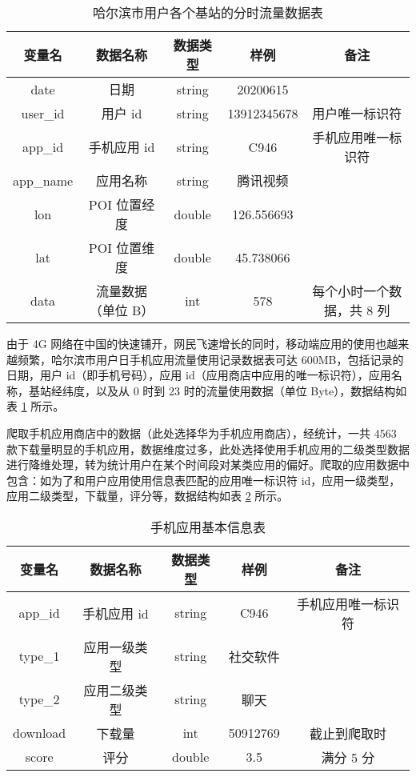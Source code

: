 \begin{table}[htbp]
    \caption{哈尔滨市用户各个基站的分时流量数据表}
    \vspace{0.5em}\centering\wuhao
    \begin{tabular}{ccccc}
        \toprule[1.5pt]
        变量名 & 数据名称 & 数据类型 & 样例 & 备注 \\
        \midrule[1pt]
        date & 日期 & string & 20200615 & \\
        user\_id & 用户 id & string & 13912345678 & 用户唯一标识符 \\
        app\_id & 手机应用 id & string & C946 & 手机应用唯一标识符 \\
        app\_name & 应用名称 & string & 腾讯视频 & \\
        lon & POI 位置经度 & double & 126.556693 & \\
        lat & POI 位置维度 & double & 45.738066 & \\
        data & 流量数据（单位 B） & int & 578 & 每个小时一个数据，共 8 列 \\
        \bottomrule[1.5pt]
    \end{tabular}
    \label{tab:app_use}
\end{table}

由于 4G 网络在中国的快速铺开，网民飞速增长的同时，移动端应用的使用也越来越频繁，哈尔滨市用户日手机应用流量使用记录数据表可达 600MB，包括记录的日期，用户 id（即手机号码），应用 id（应用商店中应用的唯一标识符），应用名称，基站经纬度，以及从 0 时到 23 时的流量使用数据（单位 Byte），数据结构如表 \ref{tab:app_use} 所示。

爬取手机应用商店中的数据（此处选择华为手机应用商店），经统计，一共 4563 款下载量明显的手机应用，数据维度过多，此处选择使用手机应用的二级类型数据进行降维处理，转为统计用户在某个时间段对某类应用的偏好。爬取的应用数据中包含：如为了和用户应用使用信息表匹配的应用唯一标识符 id，应用一级类型，应用二级类型，下载量，评分等，数据结构如表 \ref{tab:app_info} 所示。

\begin{table}[htbp]
    \caption{手机应用基本信息表}
    \vspace{0.5em}\centering\wuhao
    \begin{tabular}{ccccc}
        \toprule[1.5pt]
        变量名 & 数据名称 & 数据类型 & 样例 & 备注 \\
        \midrule[1pt]
        app\_id & 手机应用 id & string & C946 & 手机应用唯一标识符 \\
        type\_1 & 应用一级类型 & string & 社交软件 & \\
        type\_2 & 应用二级类型 & string & 聊天 & \\
        download & 下载量 & int & 50912769 & 截止到爬取时 \\
        score & 评分 & double & 3.5 & 满分 5 分 \\
        \bottomrule[1.5pt]
    \end{tabular}
    \label{tab:app_info}
\end{table}

